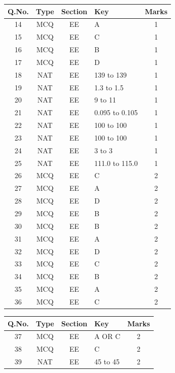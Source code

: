 \documentclass[a4paper,10pt]{exam}
\theoremstyle{remark}
\begin{document}
\begin{enumerate}
\begin{table}[ht]
\begin{tabular}{|c|c|c|l|c|}
\hline
\textbf{Q.No.} & \textbf{Type} & \textbf{Section} & \textbf{Key}         & \textbf{Marks} \\
\hline
14 & MCQ & EE & A                & 1 \\
15 & MCQ & EE & C                & 1 \\
16 & MCQ & EE & B                & 1 \\
17 & MCQ & EE & D                & 1 \\
18 & NAT & EE & 139 to 139       & 1 \\
19 & NAT & EE & 1.3 to 1.5       & 1 \\
20 & NAT & EE & 9 to 11          & 1 \\
21 & NAT & EE & 0.095 to 0.105   & 1 \\
22 & NAT & EE & 100 to 100       & 1 \\
23 & NAT & EE & 100 to 100       & 1 \\
24 & NAT & EE & 3 to 3           & 1 \\
25 & NAT & EE & 111.0 to 115.0   & 1 \\
26 & MCQ & EE & C                & 2 \\
27 & MCQ & EE & A                & 2 \\
28 & MCQ & EE & D                & 2 \\
29 & MCQ & EE & B                & 2 \\
30 & MCQ & EE & B                & 2 \\
31 & MCQ & EE & A                & 2 \\
32 & MCQ & EE & D                & 2 \\
33 & MCQ & EE & C                & 2 \\
34 & MCQ & EE & B                & 2 \\
35 & MCQ & EE & A                & 2 \\
36 & MCQ & EE & C                & 2 \\
\hline
\end{tabular}
\end{table}
\newpage
\begin{table}[ht]
\centering
\renewcommand{\arraystretch}{2}
\begin{tabular}{|c|c|c|l|c|}
\hline
\textbf{Q.No.} & \textbf{Type} & \textbf{Section} & \textbf{Key}         & \textbf{Marks} \\
\hline
37 & MCQ & EE & A OR C              & 2 \\
38 & MCQ & EE & C                   & 2 \\
39 & NAT & EE & 45 to 45            & 2 \\

\end{tabular}
\end{table}
\end{enumerate}
\end{document}
